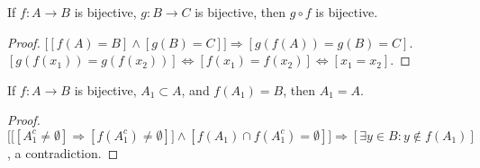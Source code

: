     \begin{theorem}
    If $f:A\rightarrow B$ is bijective, $g:B\rightarrow C$ is bijective, then $g\circ f$ is bijective.
    \end{theorem}
    \begin{proof}
    $\big[[f(A) = B]\land [g(B) = C]\big]\Rightarrow [g(f(A)) = g(B) = C]$. $[g(f(x_1))=g(f(x_2))]\Leftrightarrow [f(x_1)=f(x_2)]\Leftrightarrow [x_1=x_2]$.
    \end{proof}
    \begin{theorem}
    If $f:A\rightarrow B$ is bijective, $A_1\subset A$, and $f(A_1) = B$, then $A_1=A$.
    \end{theorem}
    \begin{proof}
    $\Big[\big[[A_1^c \ne \emptyset]\Rightarrow [f(A_1^c) \ne \emptyset]\big]\land[f(A_1)\cap f(A_1^c) = \emptyset]\Big]\Rightarrow [\exists y\in B:y\notin f(A_1)]$, a contradiction.
    \end{proof}